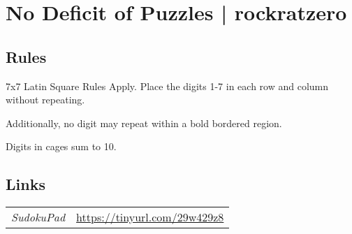 \section[No Deficit of Puzzles | rockratzero {[\emph{Deficit Killer Sudoku}]}]{No Deficit of Puzzles | {\normalfont rockratzero}}
\label{sec:04-no-deficit-of-puzzles-rockratzero}

\subsection*{Rules}
\begin{markdown}
7x7 Latin Square Rules Apply. Place the digits 1-7 in each row and column without repeating. 

Additionally, no digit may repeat within a bold bordered region. 

Digits in cages sum to 10.
\end{markdown}
\subsection*{Links}
\begin{tabularx}{\textwidth}{l X}
\emph{SudokuPad} & \url{https://tinyurl.com/29w429z8} \\
\end{tabularx}
\pagebreak
